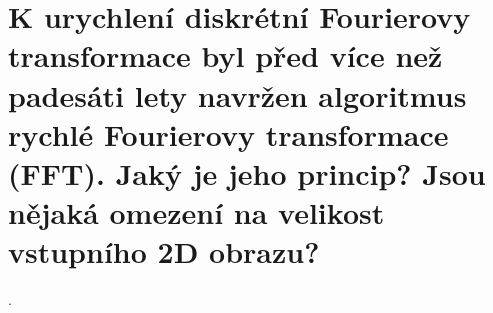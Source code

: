 \section{K urychlení diskrétní Fourierovy transformace byl před více než padesáti lety navržen algoritmus rychlé 
Fourierovy transformace (FFT). Jaký je jeho princip? Jsou nějaká omezení na velikost vstupního 2D obrazu?}.